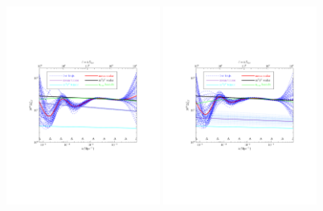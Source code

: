 \documentclass[11pt]{article}
\def \halffigwidth{0.45\textwidth}
\begin{document}
\begin{figure}
  \includegraphics[width=\halffigwidth,  trim = 1in 2.9in 1in 2.9in]{nobicep_spline0_p11_r0d5_power_traj.pdf}%
  \includegraphics[width=\halffigwidth,  trim = 1in 2.9in 1in 2.9in]{spline0_p11_power_traj.pdf}

\end{figure}
\end{document}
